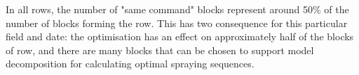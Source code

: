 \documentclass[preprint,3p,times,twocolumn]{elsarticle}
\begin{document}
\begin{table}[ht]
	\begin{center}
		\caption{Row decomposition}\label{tb:step2Aglae}
	\end{center}
\end{table}

In all rows, the number of "same command" blocks represent around 50\% of the number of blocks forming the row. This has two consequence for this particular field and date: the optimisation has an effect on approximately half of the blocks of row, and there are many blocks that can be chosen to support model decomposition for calculating optimal spraying sequences.
\end{document}
